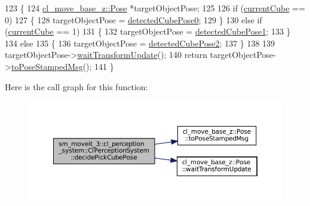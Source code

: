 \begin{DoxyCode}
123     \{
124         \hyperlink{classcl__move__base__z_1_1Pose}{cl\_move\_base\_z::Pose} *targetObjectPose;
125 
126         \textcolor{keywordflow}{if} (\hyperlink{classsm__moveit__3_1_1cl__perception__system_1_1ClPerceptionSystem_ad915fc687481d4157ec40de52f8eaa82}{currentCube} == 0)
127         \{
128             targetObjectPose = \hyperlink{classsm__moveit__3_1_1cl__perception__system_1_1ClPerceptionSystem_a6ac235df679beb12a5b5213bff957440}{detectedCubePose0};
129         \}
130         \textcolor{keywordflow}{else} \textcolor{keywordflow}{if} (\hyperlink{classsm__moveit__3_1_1cl__perception__system_1_1ClPerceptionSystem_ad915fc687481d4157ec40de52f8eaa82}{currentCube} == 1)
131         \{
132             targetObjectPose = \hyperlink{classsm__moveit__3_1_1cl__perception__system_1_1ClPerceptionSystem_a3f1b847b74fdd45ea377b626a7e8a295}{detectedCubePose1};
133         \}
134         \textcolor{keywordflow}{else}
135         \{
136             targetObjectPose = \hyperlink{classsm__moveit__3_1_1cl__perception__system_1_1ClPerceptionSystem_a2bda2a7e60579dd9d19c5b9e8a9dd79e}{detectedCubePose2};
137         \}
138 
139         targetObjectPose->\hyperlink{classcl__move__base__z_1_1Pose_a5f8576c3dacfb2f2e7f9df5105c480ea}{waitTransformUpdate}();
140         \textcolor{keywordflow}{return} targetObjectPose->\hyperlink{classcl__move__base__z_1_1Pose_a63887a88c1ac6e9a4a71b8d7d11aed6c}{toPoseStampedMsg}();
141     \}
\end{DoxyCode}
Here is the call graph for this function\+:
\nopagebreak
\begin{figure}[H]
\begin{center}
\leavevmode
\includegraphics[width=350pt]{classsm__moveit__3_1_1cl__perception__system_1_1ClPerceptionSystem_accc2813b1da308e9a71bec317db4590d_cgraph}
\end{center}
\end{figure}
\mbox{\label{classsm__moveit__3_1_1cl__perception__system_1_1ClPerceptionSystem_a0ee47269c0aacdced77b9bbe9577499d}} 
